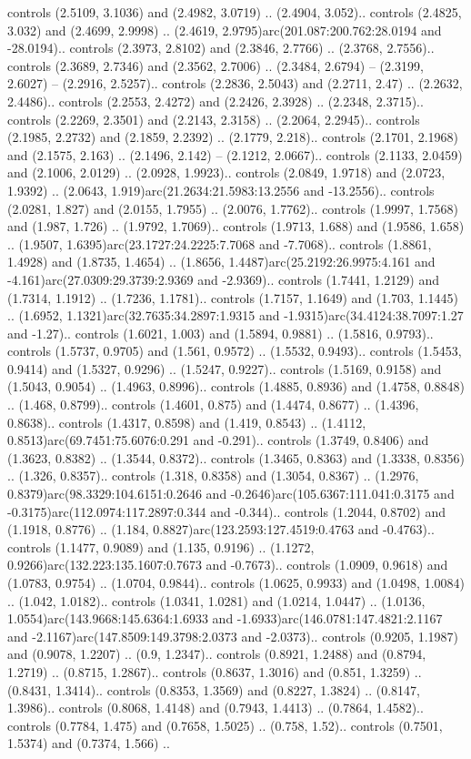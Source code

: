 controls (2.5109, 3.1036) and (2.4982, 3.0719) .. (2.4904, 3.052).. controls (2.4825, 3.032) and (2.4699, 2.9998) .. (2.4619, 2.9795)arc(201.087:200.762:28.0194 and -28.0194).. controls (2.3973, 2.8102) and (2.3846, 2.7766) .. (2.3768, 2.7556).. controls (2.3689, 2.7346) and (2.3562, 2.7006) .. (2.3484, 2.6794) -- (2.3199, 2.6027) -- (2.2916, 2.5257).. controls (2.2836, 2.5043) and (2.2711, 2.47) .. (2.2632, 2.4486).. controls (2.2553, 2.4272) and (2.2426, 2.3928) .. (2.2348, 2.3715).. controls (2.2269, 2.3501) and (2.2143, 2.3158) .. (2.2064, 2.2945).. controls (2.1985, 2.2732) and (2.1859, 2.2392) .. (2.1779, 2.218).. controls (2.1701, 2.1968) and (2.1575, 2.163) .. (2.1496, 2.142) -- (2.1212, 2.0667).. controls (2.1133, 2.0459) and (2.1006, 2.0129) .. (2.0928, 1.9923).. controls (2.0849, 1.9718) and (2.0723, 1.9392) .. (2.0643, 1.919)arc(21.2634:21.5983:13.2556 and -13.2556).. controls (2.0281, 1.827) and (2.0155, 1.7955) .. (2.0076, 1.7762).. controls (1.9997, 1.7568) and (1.987, 1.726) .. (1.9792, 1.7069).. controls (1.9713, 1.688) and (1.9586, 1.658) .. (1.9507, 1.6395)arc(23.1727:24.2225:7.7068 and -7.7068).. controls (1.8861, 1.4928) and (1.8735, 1.4654) .. (1.8656, 1.4487)arc(25.2192:26.9975:4.161 and -4.161)arc(27.0309:29.3739:2.9369 and -2.9369).. controls (1.7441, 1.2129) and (1.7314, 1.1912) .. (1.7236, 1.1781).. controls (1.7157, 1.1649) and (1.703, 1.1445) .. (1.6952, 1.1321)arc(32.7635:34.2897:1.9315 and -1.9315)arc(34.4124:38.7097:1.27 and -1.27).. controls (1.6021, 1.003) and (1.5894, 0.9881) .. (1.5816, 0.9793).. controls (1.5737, 0.9705) and (1.561, 0.9572) .. (1.5532, 0.9493).. controls (1.5453, 0.9414) and (1.5327, 0.9296) .. (1.5247, 0.9227).. controls (1.5169, 0.9158) and (1.5043, 0.9054) .. (1.4963, 0.8996).. controls (1.4885, 0.8936) and (1.4758, 0.8848) .. (1.468, 0.8799).. controls (1.4601, 0.875) and (1.4474, 0.8677) .. (1.4396, 0.8638).. controls (1.4317, 0.8598) and (1.419, 0.8543) .. (1.4112, 0.8513)arc(69.7451:75.6076:0.291 and -0.291).. controls (1.3749, 0.8406) and (1.3623, 0.8382) .. (1.3544, 0.8372).. controls (1.3465, 0.8363) and (1.3338, 0.8356) .. (1.326, 0.8357).. controls (1.318, 0.8358) and (1.3054, 0.8367) .. (1.2976, 0.8379)arc(98.3329:104.6151:0.2646 and -0.2646)arc(105.6367:111.041:0.3175 and -0.3175)arc(112.0974:117.2897:0.344 and -0.344).. controls (1.2044, 0.8702) and (1.1918, 0.8776) .. (1.184, 0.8827)arc(123.2593:127.4519:0.4763 and -0.4763).. controls (1.1477, 0.9089) and (1.135, 0.9196) .. (1.1272, 0.9266)arc(132.223:135.1607:0.7673 and -0.7673).. controls (1.0909, 0.9618) and (1.0783, 0.9754) .. (1.0704, 0.9844).. controls (1.0625, 0.9933) and (1.0498, 1.0084) .. (1.042, 1.0182).. controls (1.0341, 1.0281) and (1.0214, 1.0447) .. (1.0136, 1.0554)arc(143.9668:145.6364:1.6933 and -1.6933)arc(146.0781:147.4821:2.1167 and -2.1167)arc(147.8509:149.3798:2.0373 and -2.0373).. controls (0.9205, 1.1987) and (0.9078, 1.2207) .. (0.9, 1.2347).. controls (0.8921, 1.2488) and (0.8794, 1.2719) .. (0.8715, 1.2867).. controls (0.8637, 1.3016) and (0.851, 1.3259) .. (0.8431, 1.3414).. controls (0.8353, 1.3569) and (0.8227, 1.3824) .. (0.8147, 1.3986).. controls (0.8068, 1.4148) and (0.7943, 1.4413) .. (0.7864, 1.4582).. controls (0.7784, 1.475) and (0.7658, 1.5025) .. (0.758, 1.52).. controls (0.7501, 1.5374) and (0.7374, 1.566) .. 